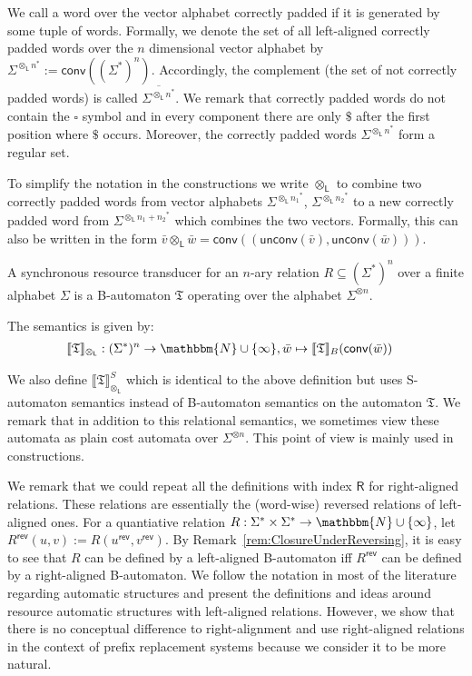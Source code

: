 \documentclass{LMCS}
\newcommand{\nat}{\mathbbm{N}}
\newcommand{\pad}{\square}
\newcommand{\natInf}{\nat \cup \{ \infty \}}
\newcommand{\automatonT}{\mathfrak T}
\newcommand{\semantics}[1]{\llbracket#1\rrbracket}
\newcommand{\padprodL}{\otimes_{\mathsf{L}}}
\newcommand{\alphVector}[2]{#1^{\otimes #2}}
\newcommand{\alphVectorL}[2]{#1^{{\padprodL #2}^*}}
\newcommand{\NalphVectorL}[2]{\overline{#1^{{\padprodL #2}^*}}}
\newcommand{\rev}{\mathsf{rev}}
\newcommand{\bindL}{\mathsf{conv}}
\newcommand{\unbind}{\mathsf{unconv}}
\begin{document}
\begin{defi}
We call a word over the vector alphabet correctly padded if it is generated
by some tuple of words. Formally, we denote the
set of all left-aligned correctly padded words over the $n$ dimensional vector 
alphabet by $\alphVectorL{\Sigma}{n} := \bindL((\Sigma^*)^n)$. Accordingly, the complement
(the set of not correctly padded words) is called $\NalphVectorL{\Sigma}{n}$.
We remark that correctly padded words do not contain the $\pad$ symbol and 
in every component there are only $\$$ after the first position where $\$$ 
occurs. Moreover, the correctly padded words $\alphVectorL{\Sigma}{n}$ form
a regular set.

To simplify the notation in the constructions we write $\padprodL$ to
combine two correctly padded words from vector alphabets
$\alphVectorL{\Sigma}{n_1}$, $\alphVectorL{\Sigma}{n_2}$ to a new correctly
padded word from $\alphVectorL{\Sigma}{n_1+n_2}$ which combines the two vectors.
Formally, this can also be written in the form $\bar v \padprodL \bar w =
\bindL((\unbind(\bar v),\unbind(\bar w)))$.
\end{defi}

\begin{defi}\label{def:SynchronousResourceTransducer}
  A synchronous resource transducer for an $n$-ary relation $R \subseteq
(\Sigma^*)^n$ over a finite alphabet $\Sigma$ is a B-automaton $\automatonT$
operating over the alphabet $\alphVector{\Sigma}{n}$.

  The semantics is given by:
  \begin{align*}
   \semantics{\automatonT}_{\padprodL} &: (\Sigma^*)^n \to \natInf, \bar w
      \mapsto \semantics{\automatonT}_B(\bindL(\bar w)) 
  \end{align*}

  We also define $\semantics{\automatonT}_{\padprodL}^S$ which is identical
to the above definition but uses S-automaton semantics instead of B-automaton
semantics on the automaton $\automatonT$. We remark that in addition to this
relational semantics, we sometimes view these automata as plain cost automata
over $\alphVector{\Sigma}{n}$. This point of view is mainly used in
constructions.
\end{defi}

We remark that we could repeat all the definitions with index $\mathsf{R}$ for
right-aligned relations. These relations are essentially the (word-wise) reversed 
relations of left-aligned ones. For a quantiative relation $R: \Sigma^* \times
\Sigma^* \to \natInf$, let $R^\rev(u,v) := R(u^\rev,v^\rev)$. By 
Remark~\ref{rem:ClosureUnderReversing}, it is easy to see that $R$ can be 
defined by a left-aligned B-automaton iff $R^\rev$ can be defined by a 
right-aligned B-automaton. 
We follow the notation in most of the literature
regarding automatic structures and present the definitions and ideas around 
resource automatic structures with left-aligned relations. However, we show 
that there is no conceptual difference to right-alignment and use right-aligned 
relations in the context of prefix replacement systems because we consider 
it to be more natural.
\end{document}
